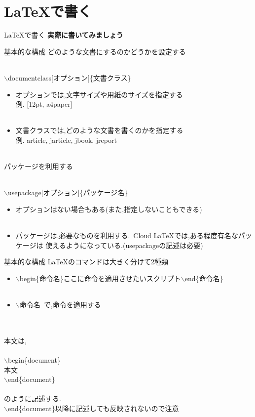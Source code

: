 \documentclass[dvipdfmx]{beamer}
\newcommand{\tbs}{$\backslash$}
\begin{document}
  \section{\LaTeX で書く}
  \begin{frame}{\LaTeX で書く}
    \centering\Huge\bf
    実際に書いてみましょう
  \end{frame}
  \begin{frame}{基本的な構成}
      どのような文書にするのかどうかを設定する\\~\\
      {\scriptsize
      \tbs documentclass[オプション]\{文書クラス\}\\
      \begin{itemize}
        \item オプションでは,文字サイズや用紙のサイズを指定する\\
              {\tiny 例. [12pt, a4paper]}\\~\\
        \item 文書クラスでは,どのような文書を書くのかを指定する\\
              {\tiny 例. article, jarticle, jbook, jreport}\\~\\
      \end{itemize}
      }
      パッケージを利用する\\~\\
      {\scriptsize
      \tbs usepackage[オプション]\{パッケージ名\}
      \begin{itemize}
        \item オプションはない場合もある(また,指定しないこともできる)\\~\\
        \item パッケージは,必要なものを利用する.~Cloud LaTeXでは,ある程度有名なパッケージは
              使えるようになっている.(usepackageの記述は必要)
      \end{itemize}
      }
  \end{frame}
  \begin{frame}{基本的な構成}
    \LaTeX のコマンドは大きく分けて2種類
    \scriptsize
    \begin{itemize}
      \item \tbs begin\{命令名\}ここに命令を適用させたいスクリプト\tbs end\{命令名\}\\~\\
      \item \tbs 命令名~で,命令を適用する\\~\\~\\
    \end{itemize}
    \scriptsize
    本文は,\\~\\
    \tbs begin\{document\}\\
    本文\\
    \tbs end\{document\}\\~\\
    のように記述する.\\
    \tbs end\{document\}以降に記述しても反映されないので注意
  \end{frame}
\end{document}
